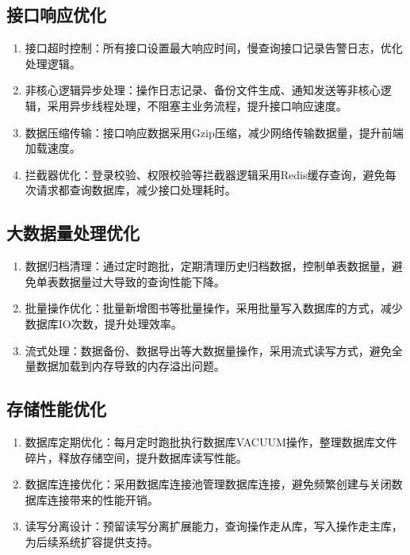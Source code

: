 \documentclass[12pt, a4paper]{article}
\begin{document}
\subsection{接口响应优化}

\begin{enumerate}
\item  接口超时控制：所有接口设置最大响应时间，慢查询接口记录告警日志，优化处理逻辑。

\item  非核心逻辑异步处理：操作日志记录、备份文件生成、通知发送等非核心逻辑，采用异步线程处理，不阻塞主业务流程，提升接口响应速度。

\item  数据压缩传输：接口响应数据采用Gzip压缩，减少网络传输数据量，提升前端加载速度。

\item  拦截器优化：登录校验、权限校验等拦截器逻辑采用Redis缓存查询，避免每次请求都查询数据库，减少接口处理耗时。
\end{enumerate}

\subsection{大数据量处理优化}

\begin{enumerate}
\item  数据归档清理：通过定时跑批，定期清理历史归档数据，控制单表数据量，避免单表数据量过大导致的查询性能下降。

\item  批量操作优化：批量新增图书等批量操作，采用批量写入数据库的方式，减少数据库IO次数，提升处理效率。

\item  流式处理：数据备份、数据导出等大数据量操作，采用流式读写方式，避免全量数据加载到内存导致的内存溢出问题。
\end{enumerate}

\subsection{存储性能优化}

\begin{enumerate}
\item  数据库定期优化：每月定时跑批执行数据库VACUUM操作，整理数据库文件碎片，释放存储空间，提升数据库读写性能。

\item  数据库连接优化：采用数据库连接池管理数据库连接，避免频繁创建与关闭数据库连接带来的性能开销。
\item  读写分离设计：预留读写分离扩展能力，查询操作走从库，写入操作走主库，为后续系统扩容提供支持。
\end{enumerate}
\end{document}
